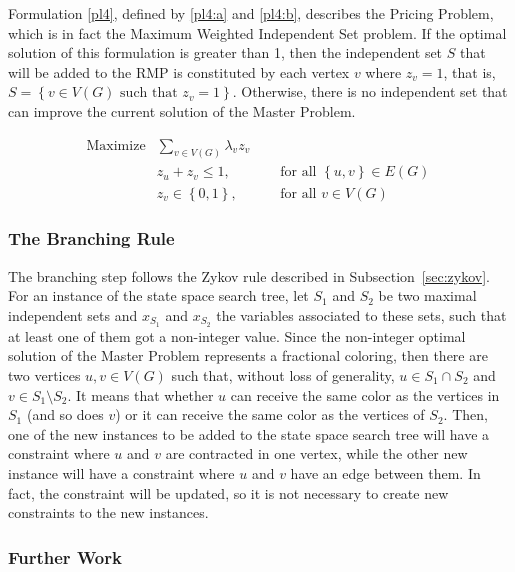 \documentclass[fleqn,10pt]{SelfArx} %
\newcommand{\chaves}[1] {\ensuremath{{\left \{ {#1} \right \}}}}
\begin{document}
	Formulation \eqref{pl4}, defined by \eqref{pl4:a} and \eqref{pl4:b}, describes the Pricing Problem, which is in fact the Maximum Weighted Independent Set problem. If the optimal solution of this formulation is greater than 1, then the
	independent set $S$ that will be added to the RMP is constituted by
	each vertex $v$ where $z_v = 1$, that is, $S = \chaves{v \in V(G) \text{ such
			that } z_v = 1}$. Otherwise, there is no independent set that can
	improve the current solution of the Master Problem.
	
	\begin{subequations}\label{pl4}
		\begin{align}
		\text{Maximize}  & \displaystyle\sum\limits_{v \in V(G)} \lambda_v z_v & \label{pl4:a}\ \\
		&z_u + z_v \leq 1, &&\text{ for all } \chaves{u,v} \in E(G) \label{pl4:b}\ \\        
		&z_v \in \chaves{0,1}, &&\text{ for all } v \in V(G)\nonumber
		\end{align}
	\end{subequations}
	
	\subsubsection{The Branching Rule}
	
	The branching step follows the Zykov rule described in Subsection~\ref{sec:zykov}. For an instance of the state space search tree, let
	$S_1$ and $S_2$ be two maximal independent sets and $x_{S_1}$ and
	$x_{S_2}$ the variables associated to these sets, such that at least
	one of them got a non-integer value. Since the non-integer optimal
	solution of the Master Problem represents a fractional coloring, then
	there are two vertices $u,v \in V(G)$ such that, without loss of
	generality, $u \in S_1 \cap S_2$ and $v \in S_1 \setminus S_2$. It means that whether
	$u$ can receive the same color as the vertices in $S_1$ (and so does
	$v$) or it can receive the same color as the vertices of $S_2$. Then,
	one of the new instances to be added to the state space search tree
	will have a constraint where $u$ and $v$ are contracted in one vertex,
	while the other new instance will have a constraint where $u$ and $v$
	have an edge between them. In fact, the constraint will be updated, so it is not necessary to create new constraints to the new instances.
	
	\subsubsection{Further Work}
		
\end{document}
